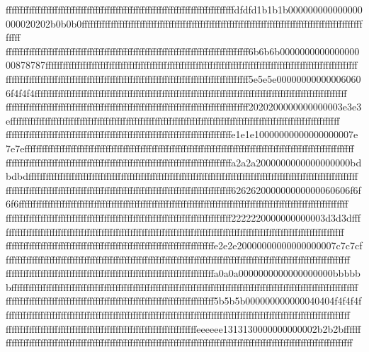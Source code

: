 {{{fffffffffffffffffffffffffffffffffffffffffffffffffffffffffffffffffffffffffffffffdfdfd1b1b1b000000000000000000020202b0b0b0ffffffffffffffffffffffffffffffffffffffffffffffffffffffffffffffffffffffffffffffffffffffffffffffffffffff
ffffffffffffffffffffffffffffffffffffffffffffffffffffffffffffffffffffffffffffffffffff6b6b6b000000000000000000878787ffffffffffffffffffffffffffffffffffffffffffffffffffffffffffffffffffffffffffffffffffffffffffffffffffffffffffff
ffffffffffffffffffffffffffffffffffffffffffffffffffffffffffffffffffffffffffffffffffff5e5e5e000000000000060606f4f4f4ffffffffffffffffffffffffffffffffffffffffffffffffffffffffffffffffffffffffffffffffffffffffffffffffffffffffffff
ffffffffffffffffffffffffffffffffffffffffffffffffffffffffffffffffffffffffffffffffffff2020200000000000003e3e3effffffffffffffffffffffffffffffffffffffffffffffffffffffffffffffffffffffffffffffffffffffffffffffffffffffffffffffffff
ffffffffffffffffffffffffffffffffffffffffffffffffffffffffffffffffffffffffffffffe1e1e10000000000000000007e7e7effffffffffffffffffffffffffffffffffffffffffffffffffffffffffffffffffffffffffffffffffffffffffffffffffffffffffffffffff
ffffffffffffffffffffffffffffffffffffffffffffffffffffffffffffffffffffffffffffffa2a2a2000000000000000000bdbdbdffffffffffffffffffffffffffffffffffffffffffffffffffffffffffffffffffffffffffffffffffffffffffffffffffffffffffffffffff
ffffffffffffffffffffffffffffffffffffffffffffffffffffffffffffffffffffffffffffff626262000000000000060606f6f6f6ffffffffffffffffffffffffffffffffffffffffffffffffffffffffffffffffffffffffffffffffffffffffffffffffffffffffffffffffff
ffffffffffffffffffffffffffffffffffffffffffffffffffffffffffffffffffffffffffffff2222220000000000003d3d3dffffffffffffffffffffffffffffffffffffffffffffffffffffffffffffffffffffffffffffffffffffffffffffffffffffffffffffffffffffffff
ffffffffffffffffffffffffffffffffffffffffffffffffffffffffffffffffffffffffe2e2e20000000000000000007c7c7cffffffffffffffffffffffffffffffffffffffffffffffffffffffffffffffffffffffffffffffffffffffffffffffffffffffffffffffffffffffff
ffffffffffffffffffffffffffffffffffffffffffffffffffffffffffffffffffffffffa0a0a0000000000000000000bbbbbbffffffffffffffffffffffffffffffffffffffffffffffffffffffffffffffffffffffffffffffffffffffffffffffffffffffffffffffffffffffff
ffffffffffffffffffffffffffffffffffffffffffffffffffffffffffffffffffffffff5b5b5b000000000000040404f4f4f4ffffffffffffffffffffffffffffffffffffffffffffffffffffffffffffffffffffffffffffffffffffffffffffffffffffffffffffffffffffffff
ffffffffffffffffffffffffffffffffffffffffffffffffffffffffffffffffffeeeeee1313130000000000002b2b2bffffffffffffffffffffffffffffffffffffffffffffffffffffffffffffffffffffffffffffffffffffffffffffffffffffffffffffffffffffffffffffff
}}}
